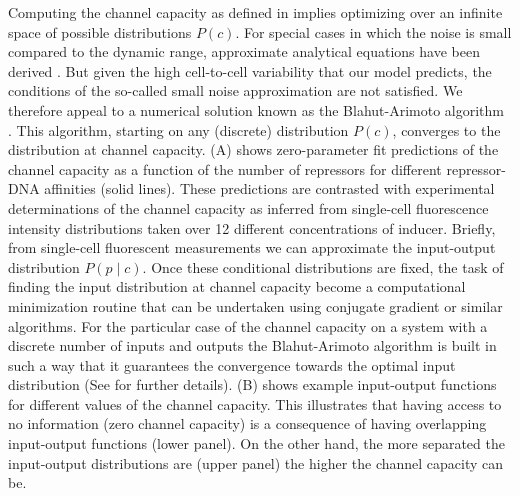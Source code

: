 Computing the channel capacity as defined in  implies
optimizing over an infinite space of possible distributions $P(c)$. For special
cases in which the noise is small compared to the dynamic range, approximate
analytical equations have been derived \cite{Tkacik2008a}. But given the high
cell-to-cell variability that our model predicts, the conditions of the
so-called small noise approximation are not satisfied. We therefore appeal to a
numerical solution known as the Blahut-Arimoto algorithm \cite{Blahut1972}.
This algorithm, starting on any (discrete) distribution $P(c)$, converges to
the distribution at channel capacity. (A) shows
zero-parameter fit predictions of the channel capacity as a function of the
number of repressors for different repressor-DNA affinities (solid lines).
These predictions are contrasted with experimental determinations of the
channel capacity as inferred from single-cell fluorescence intensity
distributions taken over 12 different concentrations of inducer. Briefly, from
single-cell fluorescent measurements we can approximate the input-output
distribution $P(p \mid c)$. Once these conditional distributions are fixed, the
task of finding the input distribution at channel capacity become a
computational minimization routine that can be undertaken using conjugate
gradient or similar algorithms. For the particular case of the channel capacity
on a system with a discrete number of inputs and outputs the Blahut-Arimoto
algorithm is built in such a way that it guarantees the convergence towards the
optimal input distribution (See  for further details).
(B) shows example input-output functions for different
values of the channel capacity. This illustrates that having access to no
information (zero channel capacity) is a consequence of having overlapping
input-output functions (lower panel). On the other hand, the more separated the
input-output distributions are (upper panel) the higher the channel capacity
can be.

